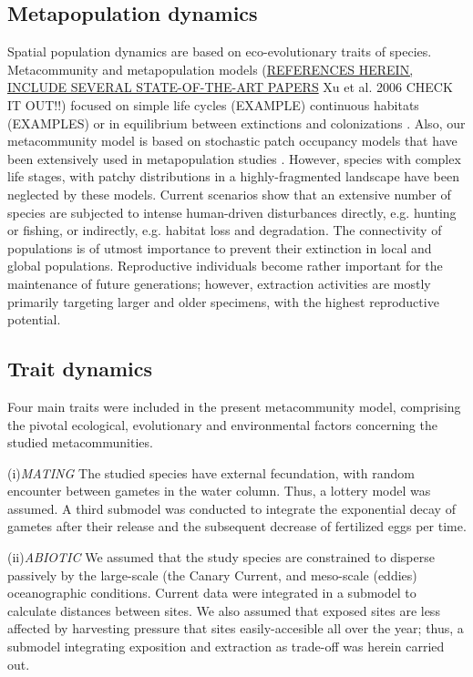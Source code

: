 \documentclass[12pt]{article}
\begin{document}
\begin{justify}
{{{{{\subsection{Metapopulation dynamics}
Spatial population dynamics are based on eco-evolutionary traits of species. Metacommunity and metapopulation models (\underline{REFERENCES HEREIN, INCLUDE SEVERAL STATE-OF-THE-ART PAPERS} Xu et al. 2006 CHECK IT OUT!!) focused on simple life cycles (EXAMPLE) continuous habitats (EXAMPLES) or in equilibrium between extinctions and colonizations \citep{hanski1994practical}. Also, our metacommunity model is based on stochastic patch occupancy models \citep{moilanen2004spomsim} that have been extensively used in metapopulation studies \citep{ovaskainen2004individual}. However, species with complex life stages, with patchy distributions in a highly-fragmented landscape have been neglected by these models. Current scenarios show that an extensive number of species are subjected to intense human-driven disturbances directly, e.g. hunting or fishing, or indirectly, e.g. habitat loss and degradation. The connectivity of populations is of utmost importance to prevent their extinction in local and global populations. Reproductive individuals become rather important for the maintenance of future generations; however, extraction activities are mostly primarily targeting larger and older specimens, with the highest reproductive potential.

\subsection {Trait dynamics}
Four main traits were included in the present metacommunity model, comprising the pivotal ecological, evolutionary and environmental factors concerning the studied metacommunities.

(i)\textit{MATING}
The studied species have external fecundation, with random encounter between gametes in the water column. Thus, a lottery model was assumed. A third submodel was conducted to integrate the exponential decay of gametes after their release and the subsequent decrease of fertilized eggs per time.

(ii)\textit{ABIOTIC}
We assumed that the study species are constrained to disperse passively by the large-scale (the Canary Current, \citep{barton1998transition} and meso-scale (eddies) oceanographic conditions. Current data were integrated in a submodel to calculate distances between sites. We also assumed that exposed sites are less affected by harvesting pressure that sites easily-accesible all over the year; thus, a submodel integrating exposition and extraction as trade-off was herein carried out.

}}}}}
\end{justify}
\end{document}

